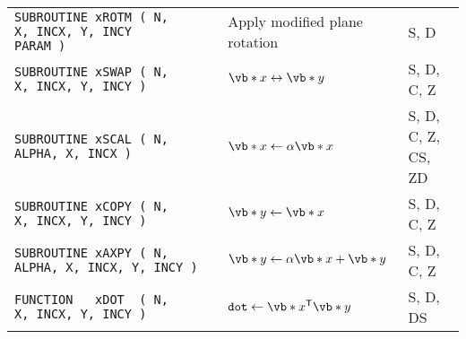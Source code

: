 \documentclass[10pt,a3paper, landscape]{article}
\newcommand{\T}{\mathsf{T}}
\begin{document}
\begin{tabular}{lll}
		\verb|SUBROUTINE xROTM ( N,         X, INCX, Y, INCY                       PARAM )             |                                                                    & Apply modified plane rotation                                                                                                                                                                                                                                & S, D               \\
		\verb|SUBROUTINE xSWAP ( N,         X, INCX, Y, INCY )                                         |                                                                    & $\vb*{x} \leftrightarrow \vb*{y}$                                                                                                                                                                                                                            & S, D, C, Z         \\
		\verb|SUBROUTINE xSCAL ( N,  ALPHA, X, INCX )                                                  |                                                                    & $\vb*{x} \gets \alpha \vb*{x}$                                                                                                                                                                                                                               & S, D, C, Z, CS, ZD \\
		\verb|SUBROUTINE xCOPY ( N,         X, INCX, Y, INCY )                                         |                                                                    & $\vb*{y} \gets \vb*{x}$                                                                                                                                                                                                                                      & S, D, C, Z         \\
		\verb|SUBROUTINE xAXPY ( N,  ALPHA, X, INCX, Y, INCY )                                         |                                                                    & $\vb*{y} \gets \alpha \vb*{x} + \vb*{y}$                                                                                                                                                                                                                     & S, D, C, Z         \\
		\verb|FUNCTION   xDOT  ( N,         X, INCX, Y, INCY )                                         |                                                                    & $\texttt{dot} \gets \vb*{x}^{\T} \vb*{y}$                                                                                                                                                                                                                    & S, D, DS           \\

\end{tabular}
\end{document}
